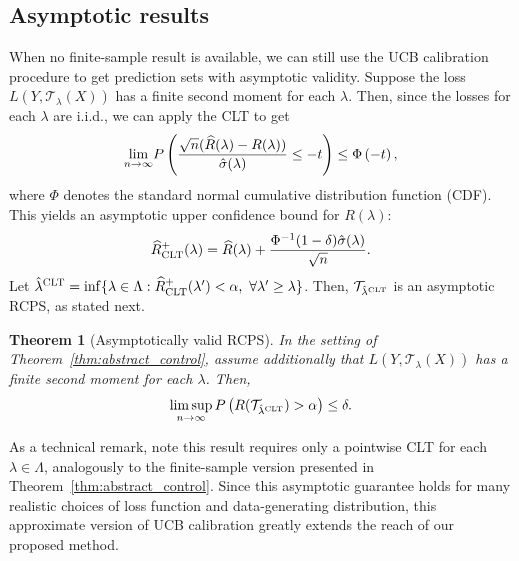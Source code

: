 \documentclass[10pt]{article}
\newtheorem{theorem}{Theorem}
\newcommand{\T}{\mathcal{T}}
\newcommand{\lhat}{\hat{\lambda}}
\newcommand{\Rhat}{\widehat{R}}
\begin{document}
\subsection{Asymptotic results}
\label{sec:clt_control}

When no finite-sample result is available, we can still use the UCB calibration procedure to get prediction sets with asymptotic validity. Suppose the loss $L(Y, \T_\lambda(X))$ has a finite second moment for each $\lambda$. Then, since the losses for each $\lambda$ are i.i.d., we can apply the CLT to get
\begin{equation}
   \underset{n \to \infty}{\rm lim} P\left(  \frac{\sqrt{n} (\widehat{R}(\lambda) - R(\lambda))}{\hat{\sigma}(\lambda)} \le -t \right) \le \Phi\left(-t \right),
\label{eq:clt_upperbound}
\end{equation}
where $\Phi$ denotes the standard normal cumulative distribution function (CDF). This yields an asymptotic upper confidence bound for $R(\lambda)$: 
\begin{equation}\label{eq:Rhat_CLT}
\Rhat_{{\rm CLT}}^+(\lambda) = \widehat{R}(\lambda) + \frac{\Phi^{-1}(1-\delta)\hat{\sigma}(\lambda)}{\sqrt{n}}.
\end{equation}
Let $\hat{\lambda}^{\textnormal{CLT}} = \inf \{\lambda \in \Lambda : \Rhat_{{\rm CLT}}^+(\lambda') < \alpha, \,\, \forall \lambda' \ge \lambda \}$. Then, $\T_{\lhat^{{\rm CLT}}}$ is an asymptotic RCPS, as stated next.
\begin{theorem}[Asymptotically valid RCPS]\label{thm:clt_coverage}
In the setting of Theorem~\ref{thm:abstract_control}, assume additionally that $L(Y, \T_\lambda(X))$ has a finite second moment for each $\lambda$. Then,
\begin{equation}
\limsup_{n \to \infty} P\left(R(\T_{\hat{\lambda}^{\textnormal{CLT}}}) > \alpha \right) \le \delta.
\end{equation}
\end{theorem}
As a technical remark, note this result requires only a pointwise CLT for each $\lambda \in \Lambda$, analogously to the finite-sample version presented in Theorem~\ref{thm:abstract_control}.
Since this asymptotic guarantee holds for many realistic choices of loss function and data-generating distribution, this approximate version of UCB calibration greatly extends the reach of our proposed method.
\end{document}
